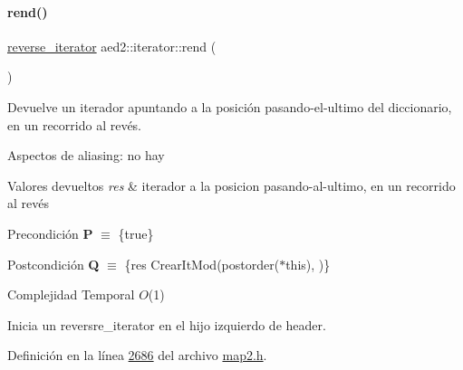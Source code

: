 \paragraph{\texorpdfstring{rend()}{rend()}\hspace{0.1cm}{\footnotesize\ttfamily [1/2]}}
{\footnotesize\ttfamily \hyperlink{classaed2_1_1iterator_a07b2c0fa31611e03cd019b290acd6d80_a07b2c0fa31611e03cd019b290acd6d80}{reverse\+\_\+iterator} aed2\+::iterator\+::rend (\begin{DoxyParamCaption}{ }\end{DoxyParamCaption})\hspace{0.3cm}{\ttfamily [inline]}}



Devuelve un iterador apuntando a la posición pasando-\/el-\/ultimo del diccionario, en un recorrido al revés. 

\begin{DoxyParagraph}{Aspectos de aliasing\+:}
no hay
\end{DoxyParagraph}

\begin{DoxyRetVals}{Valores devueltos}
{\em res} & iterador a la posicion pasando-\/al-\/ultimo, en un recorrido al revés\\
\hline
\end{DoxyRetVals}
\begin{DoxyPrecond}{Precondición}
{\bfseries P} $\equiv$ \{true\} 
\end{DoxyPrecond}
\begin{DoxyPostcond}{Postcondición}
{\bfseries Q} $\equiv$ \{res  Crear\+It\+Mod(postorder($\ast$this),  )\}
\end{DoxyPostcond}

\begin{DoxyDescription}
\item[Complejidad Temporal]$O$(1)
\end{DoxyDescription}

Inicia un reversre\+\_\+iterator en el hijo izquierdo de header. 

Definición en la línea \hyperlink{map2_8h_source_l02686}{2686} del archivo \hyperlink{map2_8h_source}{map2.\+h}.

\mbox{\label{classaed2_1_1iterator_ad7d43d936bf4f3957f590723e9029132_ad7d43d936bf4f3957f590723e9029132}} 
